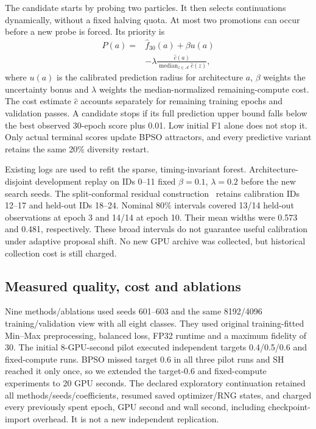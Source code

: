 The candidate starts by probing two particles. It then selects continuations dynamically, without a fixed halving quota. At most two promotions can occur before a new probe is forced. Its priority is
\begin{equation}
\begin{split}
P(a)={}&\widehat f_{30}(a)+\beta u(a)\\
&-\lambda\frac{\widehat c(a)}{\operatorname{median}_{z\in\mathcal A}\widehat c(z)},
\end{split}
\end{equation}
where $u(a)$ is the calibrated prediction radius for architecture $a$, $\beta$ weights the uncertainty bonus and $\lambda$ weights the median-normalized remaining-compute cost. The cost estimate $\widehat c$ accounts separately for remaining training epochs and validation passes. A candidate stops if its full prediction upper bound falls below the best observed 30-epoch score plus 0.01. Low initial F1 alone does not stop it. Only actual terminal scores update BPSO attractors, and every predictive variant retains the same 20\% diversity restart.

Existing logs are used to refit the sparse, timing-invariant forest. Architecture-disjoint development replay on IDs 0--11 fixed $\beta=0.1$, $\lambda=0.2$ before the new search seeds. The split-conformal residual construction~\cite{angelopoulos2021} retains calibration IDs 12--17 and held-out IDs 18--24. Nominal 80\% intervals covered 13/14 held-out observations at epoch 3 and 14/14 at epoch 10. Their mean widths were 0.573 and 0.481, respectively. These broad intervals do not guarantee useful calibration under adaptive proposal shift. No new GPU archive was collected, but historical collection cost is still charged.

\subsection{Measured quality, cost and ablations}
\label{sec:amf-measured}
Nine methods/ablations used seeds 601--603 and the same 8192/4096 training/validation view with all eight classes. They used original training-fitted Min--Max preprocessing, balanced loss, FP32 runtime and a maximum fidelity of 30. The initial 8-GPU-second pilot executed independent targets 0.4/0.5/0.6 and fixed-compute runs. BPSO missed target 0.6 in all three pilot runs and SH reached it only once, so we extended the target-0.6 and fixed-compute experiments to 20 GPU seconds. The declared exploratory continuation retained all methods/seeds/coefficients, resumed saved optimizer/RNG states, and charged every previously spent epoch, GPU second and wall second, including checkpoint-import overhead. It is not a new independent replication.

